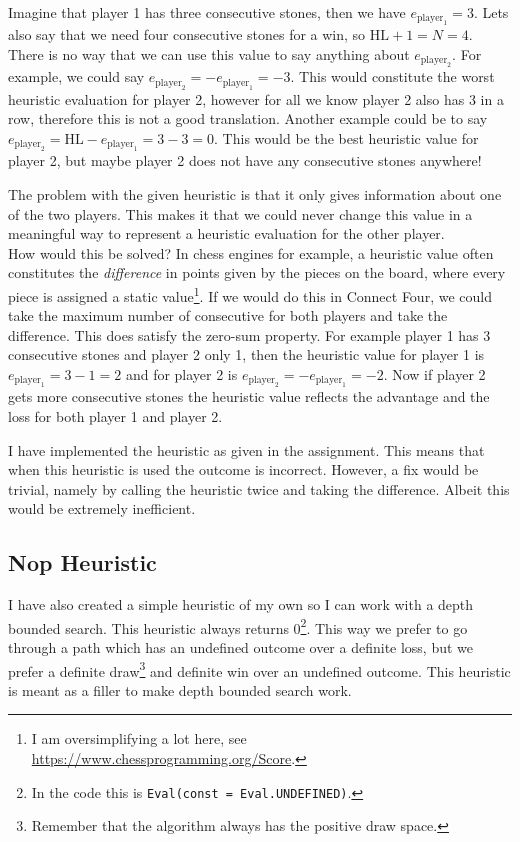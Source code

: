 \documentclass[a4paper]{article}
\begin{document}
Imagine that player 1 has three consecutive stones, then we have
$e_{\text{player}_1} = 3$. Lets also say that we need four consecutive stones
for a win, so $\text{HL} + 1 = N = 4$. There is no way that we can use this value
to say anything about $e_{\text{player}_2}$. For example, we could say
$e_{\text{player}_2} = -e_{\text{player}_1} = -3$. This would constitute the
worst heuristic evaluation for player 2, however for all we know player 2 also
has 3 in a row, therefore this is not a good translation. Another example could
be to say $e_{\text{player}_2} = \text{HL} - e_{\text{player}_1} = 3 - 3 = 0$.
This would be the best heuristic value for player 2, but maybe player 2 does
not have any consecutive stones anywhere!

The problem with the given heuristic is that it only gives information about
one of the two players. This makes it that we could never change this value in
a meaningful way to represent a heuristic evaluation for the other player.
\\

\noindent
How would this be solved? In chess engines for example, a heuristic value often
constitutes the \textit{difference} in points given by the pieces on the board,
where every piece is assigned a static value\footnote{I am oversimplifying
a lot here, see \url{https://www.chessprogramming.org/Score}.}. If we would do
this in Connect Four, we could take the maximum number of consecutive for both
players and take the difference. This does satisfy the zero-sum property. For
example player 1 has 3 consecutive stones and player 2 only 1, then the
heuristic value for player 1 is $e_{\text{player}_1} = 3 - 1 = 2$ and for
player 2 is $e_{\text{player}_2} = -e_{\text{player}_1} = -2$. Now if player 2
gets more consecutive stones the heuristic value reflects the advantage and the
loss for both player 1 and player 2.

I have implemented the heuristic as given in the assignment. This means that
when this heuristic is used the outcome is incorrect. However, a fix would be
trivial, namely by calling the heuristic twice and taking the difference.
Albeit this would be extremely inefficient.

\subsection{Nop Heuristic}
I have also created a simple heuristic of my own so I can work with a depth
bounded search. This heuristic always returns 0\footnote{In the code this is
\texttt{Eval(const = Eval.UNDEFINED)}.}. This way we prefer to go through a
path which has an undefined outcome over a definite loss, but we prefer a
definite draw\footnote{Remember that the algorithm always has the positive draw
space.} and definite win over an undefined outcome. This heuristic is meant
as a filler to make depth bounded search work.
\end{document}

